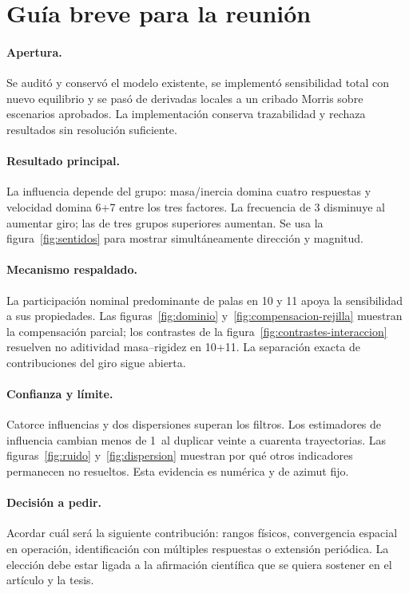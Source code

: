 \section{Guía breve para la reunión}
\paragraph{Apertura.} Se auditó y conservó el modelo existente, se implementó sensibilidad total con nuevo equilibrio y se pasó de derivadas locales a un cribado Morris sobre escenarios aprobados. La implementación conserva trazabilidad y rechaza resultados sin resolución suficiente.
\paragraph{Resultado principal.} La influencia depende del grupo: masa/inercia domina cuatro respuestas y velocidad domina 6+7 entre los tres factores. La frecuencia de 3 disminuye al aumentar giro; las de tres grupos superiores aumentan. Se usa la figura~\ref{fig:sentidos} para mostrar simultáneamente dirección y magnitud.
\paragraph{Mecanismo respaldado.} La participación nominal predominante de palas en 10 y 11 apoya la sensibilidad a sus propiedades. Las figuras~\ref{fig:dominio} y~\ref{fig:compensacion-rejilla} muestran la compensación parcial; los contrastes de la figura~\ref{fig:contrastes-interaccion} resuelven no aditividad masa--rigidez en 10+11. La separación exacta de contribuciones del giro sigue abierta.
\paragraph{Confianza y límite.} Catorce influencias y dos dispersiones superan los filtros. Los estimadores de influencia cambian menos de 1\pct\ al duplicar veinte a cuarenta trayectorias. Las figuras~\ref{fig:ruido} y~\ref{fig:dispersion} muestran por qué otros indicadores permanecen no resueltos. Esta evidencia es numérica y de azimut fijo.
\paragraph{Decisión a pedir.} Acordar cuál será la siguiente contribución: rangos físicos, convergencia espacial en operación, identificación con múltiples respuestas o extensión periódica. La elección debe estar ligada a la afirmación científica que se quiera sostener en el artículo y la tesis.

